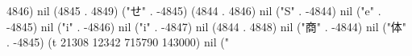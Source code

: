 4846) nil (4845 . 4849) ("せ" . -4845) (4844 . 4846) nil ("S" . -4844) nil ("e" . -4845) nil ("i" . -4846) nil ("i" . -4847) nil (4844 . 4848) nil ("商" . -4844) nil ("体" . -4845) (t 21308 12342 715790 143000) nil ("%
